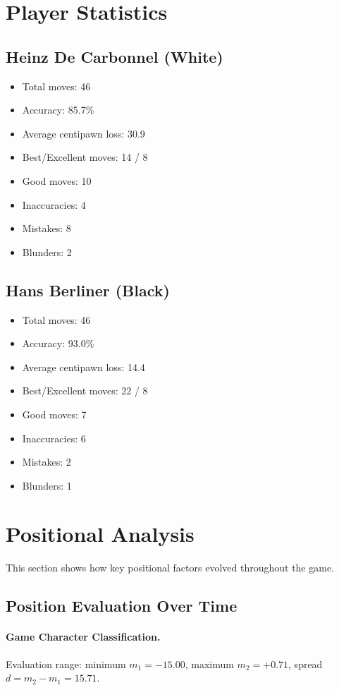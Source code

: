 \documentclass[11pt]{book}
\begin{document}
\section{Player Statistics}

\subsection{Heinz De Carbonnel (White)}
\begin{itemize}
\item Total moves: 46
\item Accuracy: 85.7\%
\item Average centipawn loss: 30.9
\item Best/Excellent moves: 14 / 8
\item Good moves: 10
\item Inaccuracies: 4
\item Mistakes: 8
\item Blunders: 2
\end{itemize}

\subsection{Hans Berliner (Black)}
\begin{itemize}
\item Total moves: 46
\item Accuracy: 93.0\%
\item Average centipawn loss: 14.4
\item Best/Excellent moves: 22 / 8
\item Good moves: 7
\item Inaccuracies: 6
\item Mistakes: 2
\item Blunders: 1
\end{itemize}

\section{Positional Analysis}

This section shows how key positional factors evolved throughout the game.

\subsection{Position Evaluation Over Time}

\paragraph{Game Character Classification.}
Evaluation range: minimum $m_1 = -15.00$, maximum $m_2 = +0.71$, spread $d = m_2 - m_1 = 15.71$.
\end{document}
